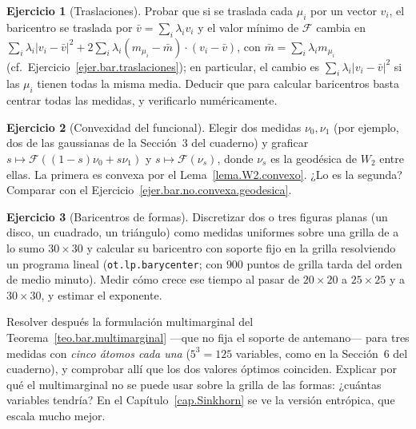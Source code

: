 \documentclass[12pt, a4paper]{amsbook}
\theoremstyle{remark}
\theoremstyle{definition}
\newtheorem{ejercicio}{Ejercicio}[chapter]
\numberwithin{section}{chapter}
\numberwithin{subsection}{section}
\numberwithin{equation}{section}
\numberwithin{figure}{chapter}
\begin{document}
\begin{ejercicio}[Traslaciones]\label{ejc.bar.traslaciones}
Probar que si se traslada cada $\mu_i$ por un vector $v_i$, el baricentro se
traslada por $\bar v=\sum_i\lambda_iv_i$ y el valor mínimo de $\mathcal F$
cambia en $\sum_i\lambda_i|v_i-\bar v|^2+2\sum_i\lambda_i(m_{\mu_i}-\bar m)\cdot(v_i-\bar v)$,
con $\bar m=\sum_i\lambda_im_{\mu_i}$ (cf.\
Ejercicio~\ref{ejer.bar.traslaciones}); en particular, el cambio es
$\sum_i\lambda_i|v_i-\bar v|^2$ si las $\mu_i$ tienen todas la misma media.
Deducir que para calcular baricentros basta centrar todas las medidas, y
verificarlo numéricamente.
\end{ejercicio}

\begin{ejercicio}[Convexidad del funcional]\label{ejc.bar.convexidad}
Elegir dos medidas $\nu_0,\nu_1$ (por ejemplo, dos de las gaussianas de la
Sección~3 del cuaderno) y graficar $s\mapsto\mathcal F((1-s)\nu_0+s\nu_1)$ y
$s\mapsto\mathcal F(\nu_s)$, donde $\nu_s$ es la geodésica de $W_2$ entre
ellas. La primera es convexa por el Lema~\ref{lema.W2.convexo}. ¿Lo es la
segunda? Comparar con el Ejercicio~\ref{ejer.bar.no.convexa.geodesica}.
\end{ejercicio}

\begin{ejercicio}[Baricentros de formas]\label{ejc.bar.formas}
Discretizar dos o tres figuras planas (un disco, un cuadrado, un triángulo)
como medidas uniformes sobre una grilla de a lo sumo $30\times30$ y calcular
su baricentro con soporte fijo en la grilla resolviendo un programa lineal
(\texttt{ot.lp.barycenter}; con $900$ puntos de grilla tarda del orden de
medio minuto). Medir cómo crece ese tiempo al pasar de $20\times20$ a
$25\times25$ y a $30\times30$, y estimar el exponente.

Resolver después la formulación multimarginal del
Teorema~\ref{teo.bar.multimarginal} —que no fija el soporte de antemano— para
tres medidas con \emph{cinco átomos cada una} ($5^3=125$ variables, como en la
Sección~6 del cuaderno), y comprobar allí que los dos valores óptimos
coinciden. Explicar por qué el multimarginal no se puede usar sobre la grilla
de las formas: ¿cuántas variables tendría? En el
Capítulo~\ref{cap.Sinkhorn} se ve la versión entrópica, que escala mucho
mejor.
\end{ejercicio}
\end{document}
